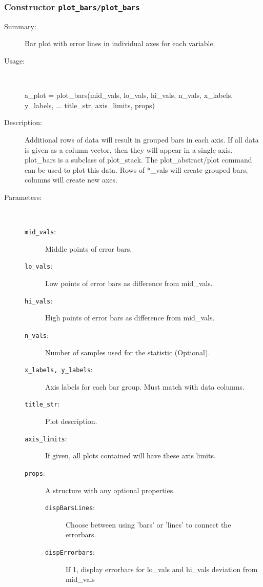 \subsubsection[Constructor \texttt{plot\_bars}]{Constructor \texttt{plot\_bars/plot\_bars}}%
%
\label{ref_plot_bars__plot_bars}%
\hypertarget{ref_plot_bars__plot_bars}{}%
\begin{description}
\item[Summary:]Bar plot with error lines in individual axes for each variable.
%
\item[Usage:]~%
\begin{lyxcode}%
a\_plot = plot\_bars(mid\_vals, lo\_vals, hi\_vals, n\_vals, x\_labels, y\_labels, ...
		     title\_str, axis\_limits, props)
%
\end{lyxcode}%
%
\item[Description:]%
Additional rows of data will result in grouped bars in each axis. If all
 data is given as a column vector, then they will appear in a single
 axis. plot\_bars is a subclass of plot\_stack. The plot\_abstract/plot
 command can be used to plot this data. Rows of *\_vals will create grouped
 bars, columns will create new axes.
\item[Parameters:]~
\begin{description}%
\item[\texttt{mid\_vals}:]
 Middle points of error bars.
\item[\texttt{lo\_vals}:]
 Low points of error bars as difference from mid\_vals.
\item[\texttt{hi\_vals}:]
 High points of error bars as difference from mid\_vals.
\item[\texttt{n\_vals}:]
 Number of samples used for the statistic (Optional).
\item[\texttt{x\_labels, y\_labels}:]
 Axis labels for each bar group. Must match with data columns.
\item[\texttt{title\_str}:]
 Plot description.
\item[\texttt{axis\_limits}:]
 If given, all plots contained will have these axis limits.
\item[\texttt{props}:]
 A structure with any optional properties.
\begin{description}%
\item[\texttt{dispBarsLines}:]
 Choose between using 'bars' or 'lines' to connect the errorbars.
\item[\texttt{dispErrorbars}:]
 If 1, display errorbars for lo\_vals and hi\_vals deviation from mid\_vals 


\end{description}
\end{description}
\end{description}
